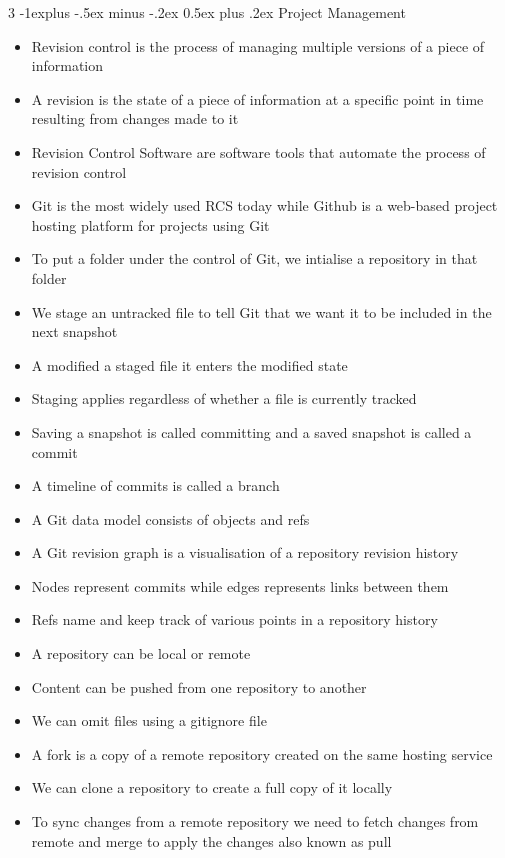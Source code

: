 \documentclass[10pt, landscape]{article}
\makeatletter
\renewcommand{\section}{\@startsection{section}{1}{0mm}%
                                {-1ex plus -.5ex minus -.2ex}%
                                {0.5ex plus .2ex}%
                                {\normalfont\large\bfseries}}
\renewcommand{\section}{\@startsection{section}{2}{0mm}%
                                {-1explus -.5ex minus -.2ex}%
                                {0.5ex plus .2ex}%
                                {\normalfont\normalsize\bfseries}}
\makeatother
\begin{document}
\begin{multicols*}{3}
\section{Project Management}
\begin{itemize}
    \item Revision control is the process of managing multiple versions of a piece of information
    \item A revision is the state of a piece of information at a specific point in time resulting from changes made to it
    \item Revision Control Software are software tools that automate the process of revision control
    \item Git is the most widely used RCS today while Github is a web-based project hosting platform for projects using Git
    \item To put a folder under the control of Git, we intialise a repository in that folder
    \item We stage an untracked file to tell Git that we want it to be included in the next snapshot
    \item A modified a staged file it enters the modified state
    \item Staging applies regardless of whether a file is currently tracked
    \item Saving a snapshot is called committing and a saved snapshot is called a commit
    \item A timeline of commits is called a branch
    \item A Git data model consists of objects and refs
    \item A Git revision graph is a visualisation of a repository revision history
    \item Nodes represent commits while edges represents links between them
    \item Refs name and keep track of various points in a repository history
    \item A repository can be local or remote
    \item Content can be pushed from one repository to another
    \item We can omit files using a gitignore file
    \item A fork is a copy of a remote repository created on the same hosting service
    \item We can clone a repository to create a full copy of it locally
    \item To sync changes from a remote repository we need to fetch changes from remote and merge to apply the changes also known as pull

\end{itemize}
\end{multicols*}
\end{document}
